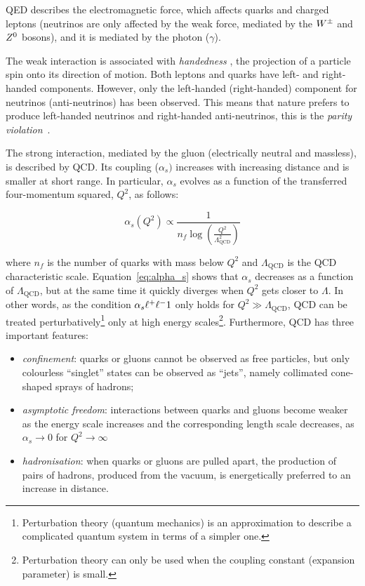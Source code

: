 			\ac{QED} describes the electromagnetic force, which affects quarks and charged leptons (neutrinos are only affected by the weak force, mediated by the $W^{\pm}$ and $Z^0$ bosons), and it is mediated by the photon ($\gamma$).

			The weak interaction is associated with \textit{handedness} \ie, the projection of a particle spin onto its direction of motion. Both leptons and quarks have left- and right-handed components. However, only the left-handed (right-handed) component for neutrinos (anti-neutrinos) has been observed. This means that nature prefers to produce left-handed neutrinos and right-handed anti-neutrinos, this is the \textit{parity violation}~\cite{Weinberg:1996kr}. 

			The strong interaction, mediated by the gluon (electrically neutral and massless), is described by \ac{QCD}. Its coupling ($\alpha_s)$ increases with increasing distance and is smaller at short range. In particular, $\alpha_s$ evolves as a function of the transferred four-momentum squared, $Q^2$, as follows: 

			\begin{equation}
				\label{eq:alpha_s}
				\alpha_s (Q^2) \propto \displaystyle \frac{1}{n_f \log (\frac{Q^2}{\Lambda_{\mathrm{QCD}}^2})} 
			\end{equation}

			\noindent where $n_f$ is the number of quarks with mass below $Q^2$ and $\Lambda_{\mathrm{QCD}}$ is the \ac{QCD} characteristic scale. Equation~\ref{eq:alpha_s} shows that $\alpha_s$ decreases as a function of $\Lambda_{\mathrm{QCD}}$, but at the same time it quickly diverges when $Q^2$ gets closer to $\Lambda$. In other words, as the condition $\alpha_s \muchless 1$ only holds for $Q^2 \gg \Lambda_{\mathrm{QCD}}$, \ac{QCD} can be treated perturbatively\footnote{Perturbation theory (quantum mechanics) is an approximation to describe a complicated quantum system in terms of a simpler one.} only at high energy scales\footnote{Perturbation theory can only be used when the coupling constant (expansion parameter) is small.}. Furthermore, \ac{QCD} has three important features:

			\begin{itemize}
				\item \emph{confinement}: quarks or gluons cannot be observed as free particles, but only colourless “singlet” states can be observed as “jets”, namely collimated cone-shaped sprays of hadrons; 

				\item \emph{asymptotic freedom}: interactions between quarks and gluons become weaker as the energy scale increases and the corresponding length scale decreases, as $\alpha_s \to 0$ for $Q^2 \to \infty$~%

				\item \emph{hadronisation}: when quarks or gluons are pulled apart, the production of pairs of hadrons, produced from the vacuum, is energetically preferred to an increase in distance.
			\end{itemize}

